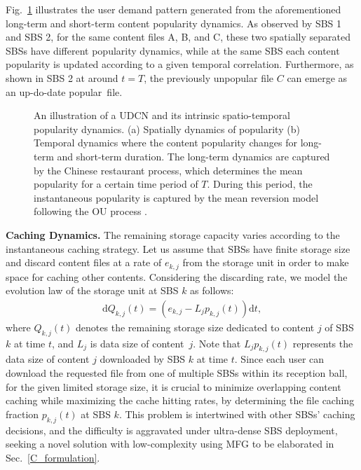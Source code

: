\documentclass{book}
\begin{document}
Fig.~\ref{system_model_CRP} illustrates the user demand pattern generated from the aforementioned long-term and short-term content popularity dynamics. As observed by SBS 1 and SBS 2, for the same content files A, B, and C, these two spatially separated SBSs have different popularity dynamics, while at the same SBS each content popularity is updated according to a given temporal correlation. Furthermore, as shown in SBS 2 at around $t=T$, the previously unpopular file $C$ can emerge as an up-do-date popular~file.

\begin{figure}
    \centering
    \caption{\small{An illustration of a UDCN and its intrinsic spatio-temporal popularity dynamics. (a) Spatially dynamics of popularity  (b) Temporal dynamics where the content popularity changes for long-term and short-term duration. The long-term dynamics are captured by the Chinese restaurant process, which determines the mean popularity for a certain time period of $T$. During this period, the instantaneous popularity is captured by the mean reversion model following the OU process  \cite{MF_ref2}.  }}\label{system_model_CRP} 
    \end{figure}
 
    \textbf{Caching Dynamics.}\quad
    The remaining storage capacity varies according to the instantaneous caching strategy. 
    Let us assume that SBSs have finite storage size and discard content files at a rate of $e_{k,j}$ from the storage unit in order to make space for caching other contents.
    Considering the discarding rate, we model
    the evolution law of the storage unit at SBS $k$ as follows: 
    \begin{align}
    \text{d}Q_{k,j}(t)=(e_{k,j}-L_j p_{k,j}(t))\text{d}t, \label{SDE_q}
    \end{align}
    where $Q_{k,j}(t)$ denotes the remaining storage size dedicated to content $j$ of SBS $k$ at time $t$, and $L_j$ is data size of content~$j$. Note that $L_j p_{k,j}(t)$ represents the data size of content $j$ downloaded by SBS $k$ at time $t$. Since each user can download the requested file from one of multiple SBSs within its reception ball, for the given limited storage size, it is crucial to minimize overlapping content caching while maximizing the cache hitting rates, by determining the file caching fraction $p_{k,j}(t)$ at SBS $k$. This problem is intertwined with other SBSs' caching decisions, and the difficulty is aggravated under ultra-dense SBS deployment, seeking a novel solution with low-complexity using MFG to be elaborated in Sec.~\ref{C_formulation}.
    
\end{document}
